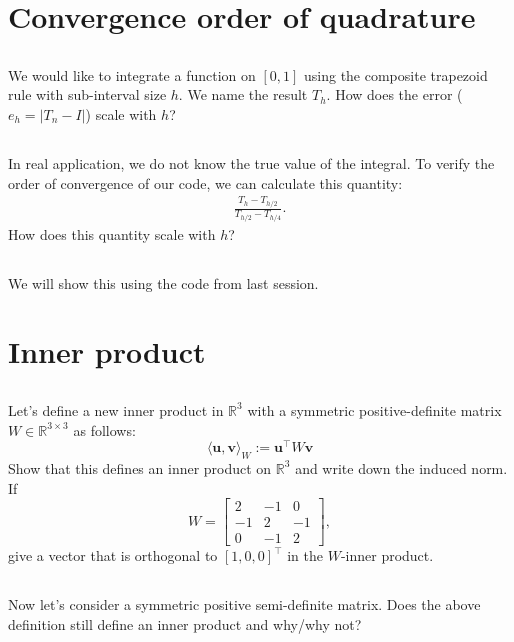 \documentclass[11pt,letterpaper]{article}
\begin{document}
\section{Convergence order of quadrature}
\subsection{}
We would like to integrate a function on $[0,1]$ using the composite trapezoid rule with sub-interval size $h$. We name the result $T_h$. How does the error ($e_h = |T_n-I|$) scale with $h$?

\subsection{}
In real application, we do not know the true value of the integral. To verify the order of convergence of our code, we can calculate this quantity:
\begin{align*}
    \frac{T_h-T_{h/2}}{T_{h/2}-T_{h/4}}.
\end{align*}
How does this quantity scale with $h$?

\subsection{}
We will show this using the code from last session.

\section{Inner product}
\subsection{}
Let's define a new inner product in $\mathbb R^3$ with a symmetric
  positive-definite matrix $W\in \mathbb R^{3\times 3}$ as follows:
  $$
  \langle \boldsymbol u, \boldsymbol v\rangle_W := \boldsymbol u^\top W \boldsymbol v
  $$
  Show that this defines an inner product on $\mathbb R^3$ and write
  down the induced norm. If 
  $$W=\begin{bmatrix}2& -1& 0 \\ -1 & 2 & -1
  \\ 0 & -1 & 2 \end{bmatrix},$$
  give a vector that is orthogonal to
  $[1,0,0]^\top$ in the $W$-inner product.

\subsection{}
Now let's consider a symmetric positive
  semi-definite matrix. Does the above definition still define an
  inner product and why/why not?
  
\end{document}
